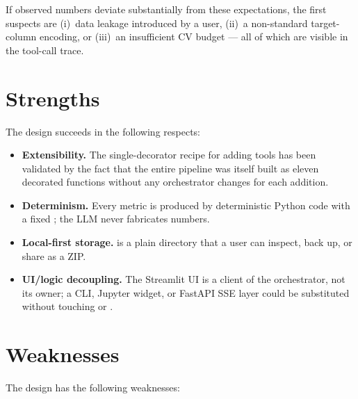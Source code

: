 If observed numbers deviate substantially from these expectations,
the first suspects are (i)~data leakage introduced by a user, (ii)~a
non-standard target-column encoding, or (iii)~an insufficient CV
budget --- all of which are visible in the tool-call trace.

\section{Strengths}
\label{sec:strengths}

The design succeeds in the following respects:

\begin{itemize}[leftmargin=1.4em]
  \item \textbf{Extensibility.} The single-decorator recipe for
        adding tools has been validated by the fact that the entire
        pipeline was itself built as eleven decorated functions
        without any orchestrator changes for each addition.
  \item \textbf{Determinism.} Every metric is produced by
        deterministic Python code with a fixed ;
        the LLM never fabricates numbers.
  \item \textbf{Local-first storage.} 
        is a plain directory that a user can inspect, back up, or
        share as a ZIP.
  \item \textbf{UI/logic decoupling.} The Streamlit UI is a
        client of the orchestrator, not its owner; a CLI, Jupyter
        widget, or FastAPI SSE layer could be substituted without
        touching  or .
\end{itemize}

\section{Weaknesses}
\label{sec:weaknesses}

The design has the following weaknesses:

